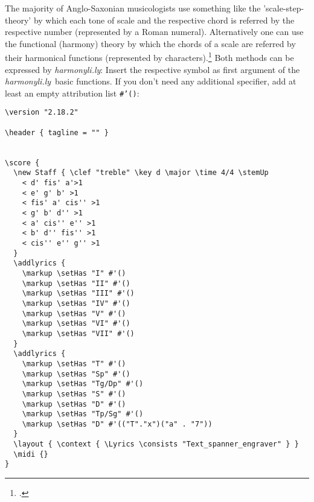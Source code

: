\documentclass[
  DIV=calc,
  BCOR=5mm,
  12pt,
  headings=small,
  oneside,
  abstract=true,
  toc=bib,
  xcolor=dvipsnames,
  openany,
  ngerman,english]{scrartcl}
\newcommand{\hlyn}[0]{\textit{harmonyli.ly}}
\begin{document}
The majority of Anglo-Saxonian musicologists use something like the
'scale-step-theory' by which each tone of scale and the respective chord is
referred by the respective number (represented by a Roman numeral).
Alternatively one can use the functional (harmony) theory by which the chords of
a scale are referred by their harmonical functions (represented by
characters).\footcite[for dedails cf.][\nopage wp]{wpFunctionTheory2019a} Both
methods can be expressed by \hlyn: Insert the respective symbol as first
argument of the \hlyn\ basic functions. If you don't need any additional
specifier, add at least an empty attribution list \texttt{\#'()}:

\begin{center}
\end{center}
\begin{scriptsize}
\begin{verbatim}
\version "2.18.2"

\header { tagline = "" }

  
\score {
  \new Staff { \clef "treble" \key d \major \time 4/4 \stemUp
    < d' fis' a'>1 
    < e' g' b' >1  
    < fis' a' cis'' >1
    < g' b' d'' >1  
    < a' cis'' e'' >1 
    < b' d'' fis'' >1  
    < cis'' e'' g'' >1
  }
  \addlyrics {
    \markup \setHas "I" #'()
    \markup \setHas "II" #'()
    \markup \setHas "III" #'()
    \markup \setHas "IV" #'()
    \markup \setHas "V" #'()
    \markup \setHas "VI" #'()
    \markup \setHas "VII" #'()
  }
  \addlyrics {
    \markup \setHas "T" #'()
    \markup \setHas "Sp" #'()
    \markup \setHas "Tg/Dp" #'()
    \markup \setHas "S" #'()
    \markup \setHas "D" #'()
    \markup \setHas "Tp/Sg" #'()
    \markup \setHas "D" #'(("T"."x")("a" . "7"))
  }
  \layout { \context { \Lyrics \consists "Text_spanner_engraver" } }
  \midi {}
}
\end{verbatim}
\end{scriptsize}
\end{document}
